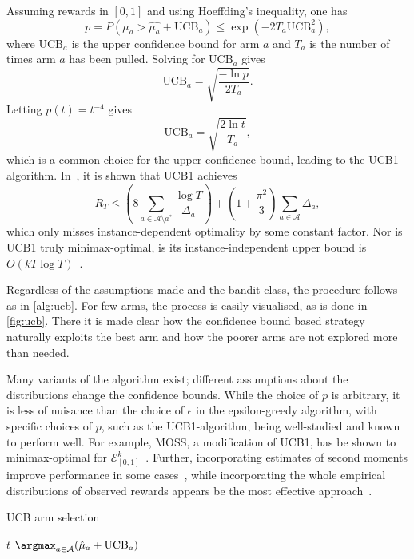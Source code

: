 Assuming rewards in $[0,1]$ and using Hoeffding's inequality, one has
\begin{equation}
    p
    = P(\mu_a > \hat{\mu_a} + \text{UCB}_a)
    \leq \exp(-2T_a \text{UCB}_a^2),
\end{equation}
where $\text{UCB}_a$ is the upper confidence bound for arm $a$ and $T_a$ is the number of times arm $a$ has been pulled.
Solving for $\text{UCB}_a$ gives
\begin{equation}
    \text{UCB}_a = \sqrt{\frac{-\ln p}{2T_a}}.
\end{equation}
Letting $p(t) = t^{-4}$ gives
\begin{equation}
    \text{UCB}_a = \sqrt{\frac{2 \ln t}{T_a}},
\end{equation}
which is a common choice for the upper confidence bound, leading to the UCB1-algorithm.
In~\autocite{auer2002}, it is shown that UCB1 achieves
\begin{equation}
    R_T
    \leq
    \left( 8 \sum_{a \in \mathcal{A} \setminus a^*} \frac{\log T}{\Delta_a} \right)
    + \left(1 + \frac{\pi^2}{3}\right) \sum_{a \in \mathcal{A}} \Delta_a,
\end{equation}
which only misses instance-dependent optimality by some constant factor.
Nor is UCB1 truly minimax-optimal, is its instance-independent upper bound is $O(kT \log T)$~\autocite{bubeck2012}.


Regardless of the assumptions made and the bandit class, the procedure follows as in \cref{alg:ucb}.
For few arms, the process is easily visualised, as is done in \cref{fig:ucb}.
There it is made clear how the confidence bound based strategy naturally exploits the best arm and how the poorer arms are not explored more than needed.

Many variants of the algorithm exist; different assumptions about the distributions change the confidence bounds.
While the choice of $p$ is arbitrary, it is less of nuisance than the choice of $\epsilon$ in the epsilon-greedy algorithm, with specific choices of $p$, such as the UCB1-algorithm, being well-studied and known to perform well.
For example, MOSS, a modification of UCB1, has be shown to minimax-optimal for $\mathcal{E}_{[0,1]}^k$~\autocite{audibert2009}.
Further, incorporating estimates of second moments improve performance in some cases~\autocite{audibert2009a}, while incorporating the whole empirical distributions of observed rewards appears be the most effective approach~\autocite{maillard2011}.

\begin{algorithm}
    \caption{UCB arm selection}
    \label{alg:ucb}
    \begin{algorithmic}
        \State \Return $t$
        \Else
        \State \Return $\argmax_{a \in \mathcal{A}} (\hat{\mu}_a + \text{UCB}_a)$
        \EndIf
    \end{algorithmic}
\end{algorithm}


